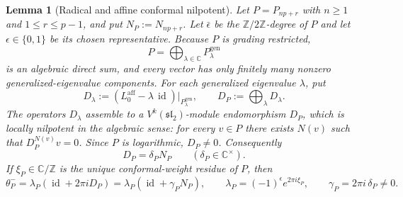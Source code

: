 \documentclass[12pt,leqno]{amsart}
\numberwithin{equation}{section}
\newtheorem{lem}[thm]{Lemma}
\newcommand{\id}{\operatorname{id}}
\def\Z{\mathbb{Z}}
\def\C{\mathbb{C}}
\begin{document}
\begin{lem}[Radical and affine conformal nilpotent]\label{lem:source-L0-radical}
Let $P=P_{np+r}$ with $n\geq1$ and $1\leq r\leq p-1$, and put
$N_P:=N_{np+r}$.  Let $\bar\epsilon$ be the $\mathbb Z/2\mathbb Z$-degree of
$P$ and let $\epsilon\in\{0,1\}$ be its chosen representative.  Because
$P$ is grading restricted,
\[
 P=\bigoplus_{\lambda\in\C}P^{\mathrm{gen}}_\lambda
\]
is an algebraic direct sum, and every vector has only finitely many
nonzero generalized-eigenvalue components.  For each generalized eigenvalue $\lambda$, put
\[
 D_\lambda:=
 (L^{\mathrm{aff}}_0-\lambda\,\id)|_{P^{\mathrm{gen}}_\lambda},
 \qquad
 D_P:=\bigoplus_\lambda D_\lambda.
\]
The operators $D_\lambda$ assemble to a
$V^k(\mathfrak{sl}_2)$-module endomorphism $D_P$, which is locally
nilpotent in the algebraic sense: for every $v\in P$ there exists $N(v)$
such that $D_P^{N(v)}v=0$.  Since $P$ is logarithmic, $D_P\ne0$.
Consequently
\[
 D_P=\delta_PN_P\qquad(\delta_P\in\C^\times).
\]
If $\xi_P\in\C/\Z$ is the unique conformal-weight residue of $P$, then
\begin{equation}\label{eq:source-twist-nilpotent}
 \theta^-_P=\lambda_P(\id+2\pi iD_P)
 =\lambda_P(\id+\gamma_PN_P),
 \qquad
 \lambda_P=(-1)^\epsilon e^{2\pi i\xi_P},\qquad
 \gamma_P=2\pi i\,\delta_P\neq0 .
\end{equation}
\end{lem}
\end{document}
